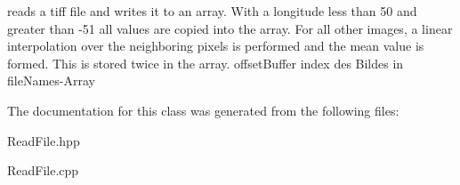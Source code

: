 reads a tiff file and writes it to an array. With a longitude less than 50 and greater than -\/51 all values are copied into the array. For all other images, a linear interpolation over the neighboring pixels is performed and the mean value is formed. This is stored twice in the array. offset\+Buffer index des Bildes in file\+Names-\/Array 

The documentation for this class was generated from the following files\+:\begin{DoxyCompactItemize}
\item 
Read\+File.\+hpp\item 
Read\+File.\+cpp\end{DoxyCompactItemize}
